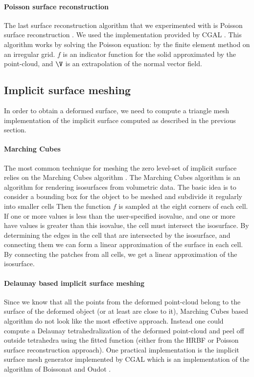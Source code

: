 \documentclass[ams]{U-AizuGT}
\begin{document}
\paragraph{Poisson surface reconstruction}
The last surface reconstruction algorithm that we experimented with is 
Poisson surface reconstruction \cite{KBH06}.
We used the implementation provided by CGAL \cite{cgal}. 
This algorithm works by solving the Poisson equation:
by the finite element method on an irregular grid. 
$f$ is an indicator function for the solid approximated by the point-cloud, 
and $\V$ is an extrapolation of the normal vector field. 


\subsection{Implicit surface meshing}
In order to obtain a deformed surface, we need to compute a triangle mesh implementation of 
the implicit surface computed as described in the previous section. 

\paragraph{Marching Cubes}
The most common technique for meshing the zero level-set of implicit surface relies 
on the Marching Cubes algorithm \cite{LC87}.
The Marching Cubes algorithm is an algorithm for rendering isosurfaces from volumetric data. 
The basic idea is to consider a bounding box for the object to be meshed and subdivide it 
regularly into smaller cells
Then the function $f$ is sampled at the eight corners of each cell. 
If one or more values is less than the user-specified isovalue, and one or more have values 
is greater than this isovalue, the cell must intersect the isosurface.
By determining the edges in the cell that are intersected by the isosurface, 
and connecting them we can form a linear approximation of the surface in each cell.
By connecting the patches from all cells, we get a linear approximation of the isosurface.

\paragraph{Delaunay based implicit surface meshing}
Since we know that all the points from the deformed point-cloud belong to the surface 
of the deformed object (or at least are close to it), 
Marching Cubes based algorithm do not look like the most effective approach.
Instead one could compute a Delaunay tetrahedralization of the deformed point-cloud and peel off outside 
tetrahedra using the fitted function (either from the HRBF or Poisson surface reconstruction approach).
One practical implementation is the implicit surface mesh generator implemented by CGAL
which is an implementation of the algorithm of Boissonat and Oudot \cite{BO05}.
\end{document}

